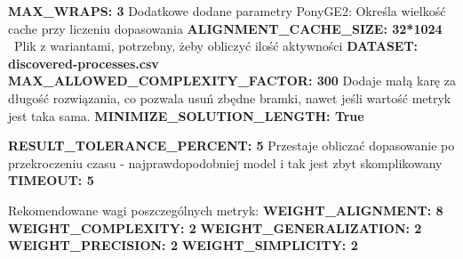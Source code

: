 \textbf{MAX\_WRAPS:                      3} \newline
Dodatkowe dodane parametry PonyGE2: 
Określa wielkość cache przy liczeniu dopasowania \newline
\textbf{ALIGNMENT\_CACHE\_SIZE:           32*1024} \newline\
Plik z wariantami, potrzebny, żeby obliczyć ilość aktywności
\textbf{DATASET:                        discovered-processes.csv} \newline
\textbf{MAX\_ALLOWED\_COMPLEXITY\_FACTOR:  300} \newline
Dodaje małą karę za długość rozwiązania, co pozwala usuń zbędne bramki, nawet jeśli wartość metryk jest taka sama. \newline
\textbf{MINIMIZE\_SOLUTION\_LENGTH:       True} \newline

\textbf{RESULT\_TOLERANCE\_PERCENT:       5} \newline
Przestaje obliczać dopasowanie po przekroczeniu czasu - najprawdopodobniej model i tak jest zbyt skomplikowany \newline
\textbf{TIMEOUT:                        5} \newline

Rekomendowane wagi poszczególnych metryk: \newline
\textbf{WEIGHT\_ALIGNMENT:              8} \newline
\textbf{WEIGHT\_COMPLEXITY:              2} \newline
\textbf{WEIGHT\_GENERALIZATION:          2} \newline
\textbf{WEIGHT\_PRECISION:               2} \newline
\textbf{WEIGHT\_SIMPLICITY:              2} \newline
